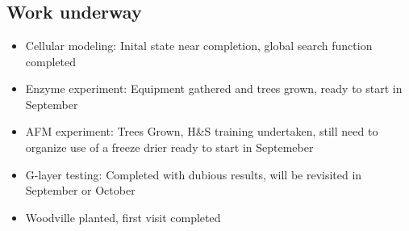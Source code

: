 \chapter{}
\section{Work underway}
\begin{itemize}
\item Cellular modeling:
Inital state near completion, global search function completed
\end{itemize}

\begin{itemize}
\item Enzyme experiment: 
Equipment gathered and trees grown, ready to start in September
\end{itemize}
\begin{itemize}
\item AFM experiment:
Trees Grown, H\&S training undertaken, still need to organize use of a freeze drier
ready to start in Septemeber
\end{itemize}
\begin{itemize}
\item G-layer testing:
Completed with dubious results, will be revisited in September or October
\end{itemize}
\begin{itemize}
\item Woodville planted, first visit completed
\end{itemize}
  
  
  
  
  